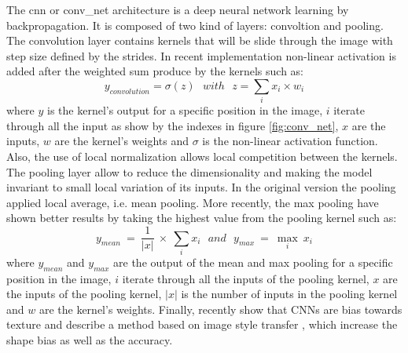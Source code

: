 \documentclass[11pt]{report}
\begin{document}
The \acrshort{cnn} or \acrshort{conv_net} architecture \cite{NIPS1989_293} is a deep neural network learning by backpropagation. It is composed of two kind of layers: convoltion and pooling. The convolution layer contains kernels that will be slide through the image with step size defined by the strides. In recent implementation \cite{5537907} non-linear activation is added after the weighted sum produce by the kernels such as:
\begin{equation}
y_{convolution} = \sigma(z)\ \ \ with\ \ \ z = \sum_{i} x_i \times w_i
\end{equation}
where $y$ is the kernel's output for a specific position in the image, $i$ iterate through all the input as show by the indexes in figure \ref{fig:conv_net}, $x$ are the inputs, $w$ are the kernel's weights and $\sigma$ is the non-linear activation function. Also, the use of local normalization allows local competition between the kernels. The pooling layer allow to reduce the dimensionality and making the model invariant to small local variation of its inputs. In the original version \textcite{NIPS1989_293} the pooling applied local average, i.e. mean pooling. More recently, the max pooling have shown better results \cite{10.1007/978-3-642-15825-4_10} by taking the highest value from the pooling kernel such as:
\begin{equation}
y_{mean}\ =\ \frac{1}{|x|}\ \times\ \sum_{i} x_i\ \ \ and\ \ \ y_{max}\ =\ \max_{i}\ x_i
\end{equation}
where $y_{mean}$ and $y_{max}$ are the output of the mean and max pooling for a specific position in the image, $i$ iterate through all the inputs of the pooling kernel, $x$ are the inputs of the pooling kernel, $|x|$ is the number of inputs in the pooling kernel and $w$ are the kernel's weights. Finally, \textcite{DBLP:journals/corr/abs-1811-12231} recently show that CNNs are bias towards texture and describe a method based on image style transfer \cite{Gatys_2016_CVPR}, which increase the shape bias as well as the accuracy.
\end{document}
